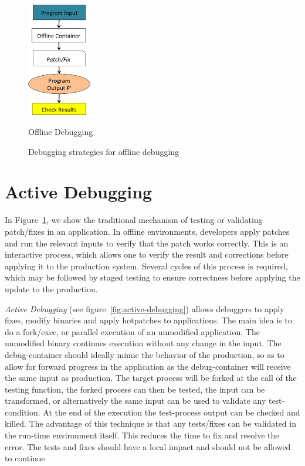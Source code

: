 \begin{figure}[ht]
	\centering
	\includegraphics[width=0.25\textwidth]{guided/figs/offline.png}
	\caption{Offline Debugging}
	\label{fig:offline-debugging}
	\caption{Debugging strategies for offline debugging}
\end{figure}

\section{Active Debugging}
\label{sec:guided-approach}

In Figure~\ref{fig:offline-debugging}, we show the traditional mechanism of testing or validating patch/fixes in an application. 
In offline environments, developers apply patches and run the relevant inputs to verify that the patch works correctly. 
This is an interactive process, which allows one to verify the result and corrections before applying it to the production system.
Several cycles of this process is required, which may be followed by staged testing to ensure correctness before applying the update to the production.


\emph{Active Debugging} (see figure~\ref{fig:active-debugging}) allows debuggers to apply fixes, modify binaries and apply hotpatches to applications. 
The main idea is to do a fork/exec, or parallel execution of an unmodified application.
The unmodified binary continues execution without any change in the input.
The debug-container should ideally mimic the behavior of the production, so as to allow for forward progress in the application as the debug-container will receive the same input as production.
The target process will be forked at the call of the testing function, the forked process can then be tested, the input can be transformed, or alternatively the same input can be used to validate any test-condition. 
At the end of the execution the test-process output can be checked and killed. 
The advantage of this technique is that any tests/fixes can be validated in the run-time environment itself.
This reduces the time to fix and resolve the error. 
The tests and fixes should have a local impact and should not be allowed to continue 


